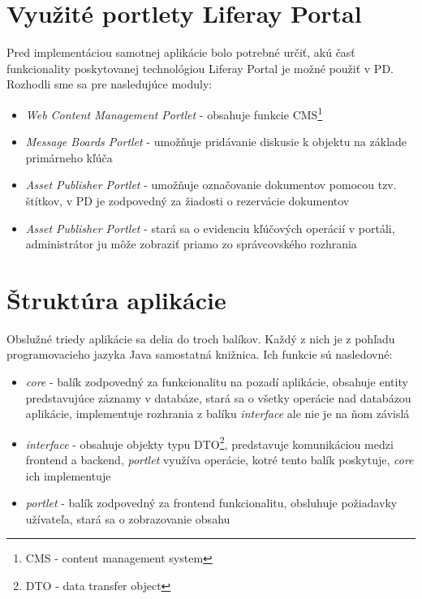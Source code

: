 \documentclass[
  print, %
  table,   %
  lof,     %
  nolot,     %
]{fithesis3}
\begin{document}
\section{Využité portlety Liferay Portal}
Pred implementáciou samotnej aplikácie bolo potrebné určiť, akú časť funkcionality poskytovanej technológiou Liferay Portal je možné použiť v PD. Rozhodli sme sa pre nasledujúce moduly:
\begin{itemize}
	\item \textit{Web Content Management Portlet} - obsahuje funkcie CMS\footnote{CMS - content management system}
	\item \textit{Message Boards Portlet} - umožňuje pridávanie diskusie k objektu na základe primárneho kľúča
	\item \textit{Asset Publisher Portlet} - umožňuje označovanie dokumentov pomocou tzv. štítkov, v PD je zodpovedný za žiadosti o rezervácie dokumentov
	\item \textit{Asset Publisher Portlet} - stará sa o evidenciu kľúčových operácií v portáli, administrátor ju môže zobraziť priamo zo správcovského rozhrania 
\end{itemize}
\section{Štruktúra aplikácie}
Obslužné triedy aplikácie sa delia do troch balíkov. Každý z nich je z pohľadu programovacieho jazyka Java samostatná knižnica. Ich funkcie sú nasledovné:
\begin{itemize}
	\item \textit{core} - balík zodpovedný za funkcionalitu na pozadí aplikácie, obsahuje entity predstavujúce záznamy v databáze, stará sa o všetky operácie nad databázou aplikácie, implementuje rozhrania z balíku \textit{interface} ale nie je na ňom závislá
	\item \textit{interface} - obsahuje objekty typu DTO\footnote{DTO - data transfer object}, predstavuje komunikáciou medzi frontend a backend, \textit{portlet} využíva operácie, kotré tento balík poskytuje, \textit{core} ich implementuje
	\item \textit{portlet} - balík zodpovedný za frontend funkcionalitu, obsluhuje požiadavky užívateľa, stará sa o zobrazovanie obsahu\cite{java-ee}
\end{itemize}
\end{document}
